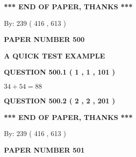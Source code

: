 \documentclass[12pt]{article}
\begin{document}
   
   
   
   
\vspace{1.0in} 
{\textbf{\large{ *** END OF PAPER, THANKS *** }}} 
   
   
\hspace{1.0in} By: 
 239 ( 416 ,  613 )
   
   
   
   
\newpage 
\setcounter{page}{ 
   500001 } 
   
   
   
   
 {\textbf{ \Large{ PAPER NUMBER  500  }}}
   
   
\vspace{0.2in}
   
   
   
   
   
   
 \vspace{0.2in}
{\LARGE {\textbf{ A QUICK TEST EXAMPLE}}}
   
   
  
\vspace{0.2in}
  
{\textbf{\Large{QUESTION
500.1 
 ( 1 , 1 , 101 )
}}}
  
  
 
 

$ %
34 +  %
54=   %
88$
 
 
  
\vspace{0.2in}
  
{\textbf{\Large{QUESTION
500.2 
 ( 2 , 2 , 201 )
}}}
  
  
   
   
 \vspace{0.2in}
 
   
   
   
   
\vspace{1.0in} 
{\textbf{\large{ *** END OF PAPER, THANKS *** }}} 
   
   
\hspace{1.0in} By: 
 239 ( 416 ,  613 )
   
   
   
   
\newpage 
\setcounter{page}{ 
   501001 } 
   
   
   
   
 {\textbf{ \Large{ PAPER NUMBER  501  }}}
   
\end{document}

